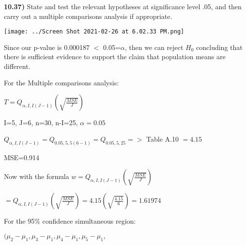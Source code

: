 \documentclass{article}
\begin{document}
\vspace{2mm}




\newpage
\textbf{10.37)} State and test the relevant hypotheses at significance level .05, and then carry out a multiple comparisons analysis if appropriate.

\vspace{2mm}

\texttt{[image: ../Screen Shot 2021-02-26 at 6.02.33 PM.png]}

\vspace{2mm}

Since our p-value is 0.000187 $<$ 0.05=$\alpha$, then we can reject $H_{0}$ concluding that there is sufficient evidence to support the claim that population means are different.

\vspace{2mm}

\vspace{2mm}

For the Multiple comparisons analysis:

\vspace{2mm}

$T=Q_{\alpha, I, I(J-1)} (\sqrt{\frac{MSE}{J}})$

\vspace{2mm}

I=5, J=6, n=30, n-I=25, $\alpha=0.05$

\vspace{2mm}

$Q_{\alpha, I, I(J-1)}=Q_{0.05, 5, 5(6-1)}=Q_{0.05, 5, 25} =>$ Table A.10 $=4.15$

\vspace{2mm}

MSE=0.914

Now with the formula $w=Q_{\alpha, I, I(J-1)} (\sqrt{\frac{MSE}{J}})$

\vspace{2mm}

$=Q_{\alpha, I, I(J-1)} (\sqrt{\frac{MSE}{J}})=4.15(\sqrt{\frac{4.15}{6}})=1.61974$

\vspace{2mm}

For the 95\% confidence simultaneous region: 

\vspace{2mm}

$(\mu_{2}-\mu_{1}, \mu_{3}-\mu_{1}, \mu_{4}-\mu_{1}, \mu_{5}-\mu_{1},$

\vspace{2mm}
\end{document}

